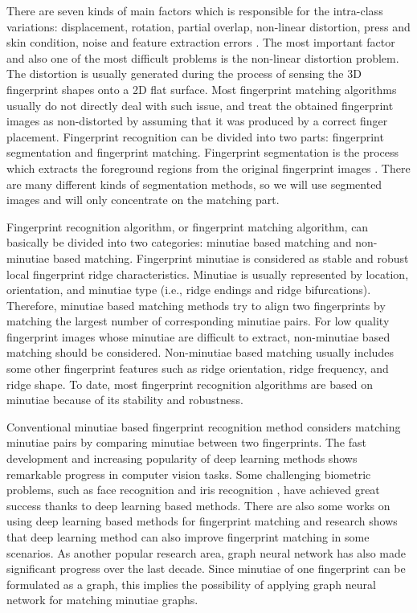 There are seven kinds of main factors which is responsible for the intra-class variations: displacement, rotation, partial overlap, non-linear distortion, press and skin condition,  noise and feature extraction errors \cite{Maltoni2009}.
The most important factor and also one of the most difficult problems is the non-linear distortion problem. The distortion is usually generated during the process of sensing the 3D fingerprint shapes onto a 2D flat surface. Most fingerprint matching algorithms usually do not directly deal with such issue, and treat the obtained fingerprint images as non-distorted by assuming that it was produced by a correct finger placement. Fingerprint recognition can be divided into two parts: fingerprint segmentation and fingerprint matching. Fingerprint segmentation is the process which extracts the foreground regions from the original fingerprint images \cite{Maltoni2009}. There are many different kinds of segmentation methods, so we will use segmented images and will only concentrate on the matching part.

Fingerprint recognition algorithm, or fingerprint matching algorithm, can basically be divided into two categories: minutiae based matching and non-minutiae based matching. Fingerprint minutiae is considered as stable and robust local fingerprint ridge characteristics. Minutiae is usually represented by location, orientation, and minutiae type (i.e., ridge endings and ridge bifurcations). Therefore, minutiae based matching methods try to align two fingerprints by matching the largest number of corresponding minutiae pairs. For low quality fingerprint images whose minutiae are difficult to extract, non-minutiae based matching should be considered. Non-minutiae based matching usually includes some other fingerprint features such as ridge orientation, ridge frequency, and ridge shape. To date, most fingerprint recognition algorithms are based on minutiae because of its stability and robustness.

Conventional minutiae based fingerprint recognition method considers matching minutiae pairs by comparing minutiae between two fingerprints. The fast development and increasing popularity of deep learning methods shows remarkable progress in computer vision tasks. Some challenging biometric problems, such as face recognition \cite{SchroffCVPR2015facenet} and iris recognition \cite{ZhaoICCV2017}, have achieved great success thanks to deep learning based methods. There are also some works on using deep learning based methods for fingerprint matching and research shows that deep learning method can also improve fingerprint matching in some scenarios. As another popular research area, graph neural network has also made significant progress over the last decade. Since minutiae of one fingerprint can be formulated as a graph, this implies the possibility of applying graph neural network for matching minutiae graphs. 


